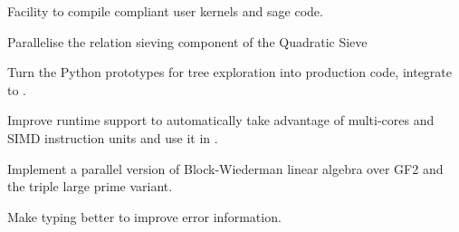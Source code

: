 \begin{workpackage}
\begin{tasklist}
\end{tasklist}
\begin{wpdelivs}
  \begin{wpdeliv}[due=3,id=pythran-sage,dissem=PU,nature=DEM]
      {Facility to compile \Pythran compliant user kernels and sage code.}
  \end{wpdeliv}
  \begin{wpdeliv}[due=3,id=QS-sieving,dissem=PU,nature=DEM]
      {Parallelise the relation sieving component of the Quadratic Sieve}
  \end{wpdeliv}
  \begin{wpdeliv}[due=3,id=HPCcombi,dissem=PU,nature=DEM]
      {Turn the Python prototypes for tree exploration into    production code, integrate to \Sage.}
\end{wpdeliv}
  \begin{wpdeliv}[due=9,id=pythran-cython,dissem=PU,nature=DEM]
      {Improve \Pythran runtime support to automatically take advantage of multi-cores and SIMD instruction units and use it in \Cython.}
  \end{wpdeliv}
  \begin{wpdeliv}[due=9,id=QS-linalg,dissem=PU,nature=DEM]
      {Implement a parallel version of Block-Wiederman linear algebra over GF2 and the triple large prime variant.}
\end{wpdeliv}

  \begin{wpdeliv}[due=12,id=pythran-typing,dissem=PU,nature=DEM]
      {Make \Pythran typing better to improve error information.}
  \end{wpdeliv}



\end{wpdelivs}
\end{workpackage}
